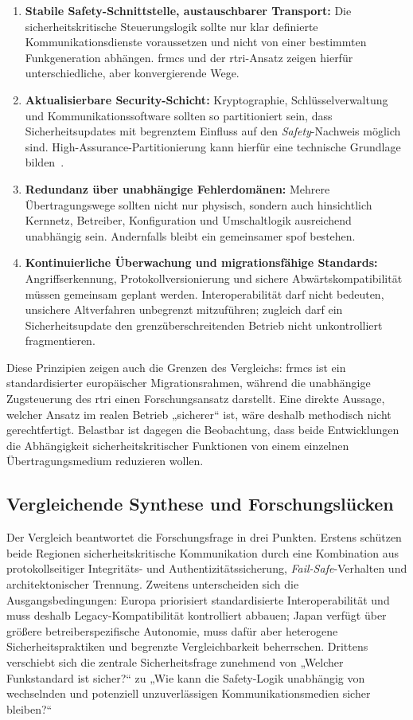 \documentclass[runningheads]{res/llncs}
\begin{document}
\begin{enumerate}
    \item \textbf{Stabile Safety-Schnittstelle, austauschbarer Transport:} Die sicherheitskritische Steuerungslogik sollte nur klar definierte Kommunikationsdienste voraussetzen und nicht von einer bestimmten Funkgeneration abhängen. \gls{frmcs} und der \gls{rtri}-Ansatz zeigen hierfür unterschiedliche, aber konvergierende Wege.
    \item \textbf{Aktualisierbare Security-Schicht:} Kryptographie, Schlüsselverwaltung und Kommunikationssoftware sollten so partitioniert sein, dass Sicherheitsupdates mit begrenztem Einfluss auf den \textit{Safety}-Nachweis möglich sind. High-Assurance-Partitionierung kann hierfür eine technische Grundlage bilden~\parencite[S. 31--35]{schulzIntegration2019}.
    \item \textbf{Redundanz über unabhängige Fehlerdomänen:} Mehrere Übertragungswege sollten nicht nur physisch, sondern auch hinsichtlich Kernnetz, Betreiber, Konfiguration und Umschaltlogik ausreichend unabhängig sein. Andernfalls bleibt ein gemeinsamer \gls{spof} bestehen.
    \item \textbf{Kontinuierliche Überwachung und migrationsfähige Standards:} Angriffserkennung, Protokollversionierung und sichere Abwärtskompatibilität müssen gemeinsam geplant werden. Interoperabilität darf nicht bedeuten, unsichere Altverfahren unbegrenzt mitzuführen; zugleich darf ein Sicherheitsupdate den grenzüberschreitenden Betrieb nicht unkontrolliert fragmentieren.
\end{enumerate}

Diese Prinzipien zeigen auch die Grenzen des Vergleichs: \gls{frmcs} ist ein standardisierter europäischer Migrationsrahmen, während die unabhängige Zugsteuerung des \gls{rtri} einen Forschungsansatz darstellt. Eine direkte Aussage, welcher Ansatz im realen Betrieb „sicherer“ ist, wäre deshalb methodisch nicht gerechtfertigt. Belastbar ist dagegen die Beobachtung, dass beide Entwicklungen die Abhängigkeit sicherheitskritischer Funktionen von einem einzelnen Übertragungsmedium reduzieren wollen.

\subsection{Vergleichende Synthese und Forschungslücken}
\label{sec:Vergleichende_Synthese}
Der Vergleich beantwortet die Forschungsfrage in drei Punkten. Erstens schützen beide Regionen sicherheitskritische Kommunikation durch eine Kombination aus protokollseitiger Integritäts- und Authentizitätssicherung, \textit{Fail-Safe}-Verhalten und architektonischer Trennung. Zweitens unterscheiden sich die Ausgangsbedingungen: Europa priorisiert standardisierte Interoperabilität und muss deshalb Legacy-Kompatibilität kontrolliert abbauen; Japan verfügt über größere betreiberspezifische Autonomie, muss dafür aber heterogene Sicherheitspraktiken und begrenzte Vergleichbarkeit beherrschen. Drittens verschiebt sich die zentrale Sicherheitsfrage zunehmend von „Welcher Funkstandard ist sicher?“ zu „Wie kann die Safety-Logik unabhängig von wechselnden und potenziell unzuverlässigen Kommunikationsmedien sicher bleiben?“
\end{document}
